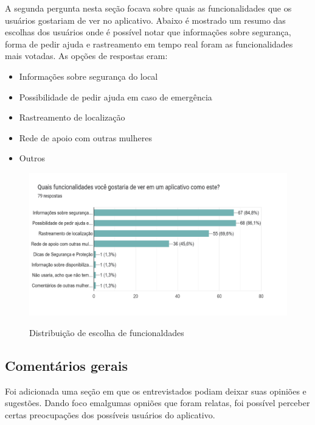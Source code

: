A segunda pergunta nesta seção focava sobre quais as funcionalidades que os usuários gostariam de ver no aplicativo. Abaixo é mostrado um resumo das escolhas dos usuários onde é possível notar que informações sobre segurança, forma de pedir ajuda e rastreamento em tempo real foram as funcionalidades mais votadas. As opções de respostas eram:
\begin{itemize}
  \item Informações sobre segurança do local
  \item Possibilidade de pedir ajuda em caso de emergência
  \item Rastreamento de localização
  \item Rede de apoio com outras mulheres
  \item Outros
\end{itemize}

\begin{figure}[h]
  \begin{center}
  \includegraphics[width=1.0\linewidth]{images/distribuicao-escolha-funcionalidades.png}\\
  \end{center}
  \caption[Distribuição de escolha de funcionalidades]{Distribuição de escolha de funcionaldades}
  \label{fig:distribuicao-escolha-funcionalidades}
\end{figure}

\subsection{Comentários gerais}
Foi adicionada uma seção em que os entrevistados podiam deixar suas opiniões e sugestões. Dando foco emalgumas opniões que foram relatas, foi possível perceber certas preocupações dos possíveis usuários do aplicativo. 

